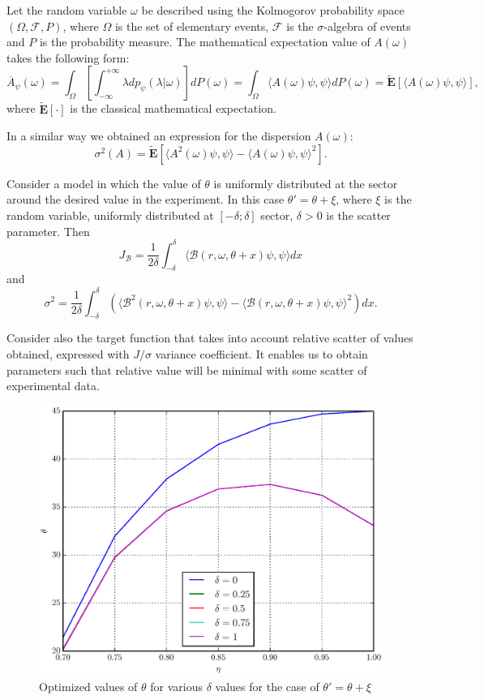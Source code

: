 \documentclass[%
master,         %
subf,           %
href,           %
colorlinks=true %
]{disser}
\numberwithin{equation}{section}
\numberwithin{figure}{section}
\begin{document}
Let the random variable $\omega$ be described using the Kolmogorov probability space $(\Omega, \mathcal{F}, P)$, where $\Omega$ is the set of elementary events, $\mathcal{F}$ is the $\sigma$-algebra of events and $P$ is the probability measure. The mathematical expectation value of $A(\omega)$ takes the following form:
\[
\overline{A}_\psi(\omega) = \int_\Omega\left[\int_{-\infty}^{+\infty}\lambda dp_\psi (\lambda|\omega)\right] dP(\omega) = \int_\Omega\langle A(\omega)\psi, \psi\rangle dP(\omega) = \mathbf{\tilde{E}}[ \langle A(\omega)\psi, \psi\rangle],
\]
where $\mathbf{\tilde{E}}[\cdot]$ is the classical mathematical expectation.

In a similar way we obtained an expression for the dispersion $A(\omega)$:
\[
\sigma^2(A) = \mathbf{\tilde{E}}[ \langle A^2(\omega)\psi, \psi\rangle - \langle A(\omega)\psi, \psi\rangle^2].
\]

Consider a model in which the value of $\theta$ is uniformly distributed at the sector around 
the desired value in the experiment. In this case $\theta' = \theta + \xi$, where $\xi$ is the random variable, uniformly distributed at $[-\delta; \delta]$ sector, $\delta > 0$ is the scatter parameter. Then
\[
J_\mathcal{B} = \frac{1}{2\delta}\int_{-\delta}^\delta \langle \mathcal{B}(r, \omega, \theta + x)\psi, \psi \rangle dx
\] and
\[
\sigma^2 = \frac{1}{2\delta}\int_{-\delta}^\delta (\langle \mathcal{B}^2(r, \omega, \theta + x)\psi, \psi \rangle - \langle \mathcal{B}(r, \omega, \theta + x)\psi, \psi \rangle^2) dx.
\]

Consider also the target function that takes into account relative scatter of values obtained, expressed with 
$J / \sigma$ variance coefficient. It enables us to obtain parameters such that relative value will be minimal 
with some scatter of experimental data.

\begin{figure}[h]
\includegraphics[scale=0.7]{theta_ang.eps}
\caption{Optimized values of $\theta$ for various $\delta$ values for the case of $\theta' = \theta + \xi$}
\label{fig:theta_ang}
\end{figure}
\end{document}
